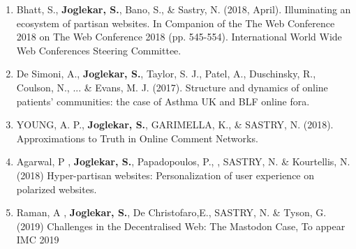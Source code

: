 \begin{enumerate}
    \item Bhatt, S., \textbf{Joglekar, S.}, Bano, S., \& Sastry, N. (2018, April). Illuminating an ecosystem of partisan websites. In Companion of the The Web Conference 2018 on The Web Conference 2018 (pp. 545-554). International World Wide Web Conferences Steering Committee.
    
    \item De Simoni, A., \textbf{Joglekar, S.}, Taylor, S. J., Patel, A., Duschinsky, R., Coulson, N., ... \& Evans, M. J. (2017). Structure and dynamics of online patients’ communities: the case of Asthma UK and BLF online fora.
    
    \item YOUNG, A. P., \textbf{Joglekar, S.}, GARIMELLA, K., \& SASTRY, N. (2018). Approximations to Truth in Online Comment Networks.
    
    \item Agarwal, P , \textbf{Joglekar, S.}, Papadopoulos, P., , SASTRY, N. \& Kourtellis, N. (2018) Hyper-partisan websites: Personalization of user experience on
    polarized websites.
    
    
    \item Raman, A , \textbf{Joglekar, S.}, De Christofaro,E., SASTRY, N. \& Tyson, G. (2019) Challenges in the Decentralised Web: The Mastodon Case, To appear IMC 2019
    


\end{enumerate}








